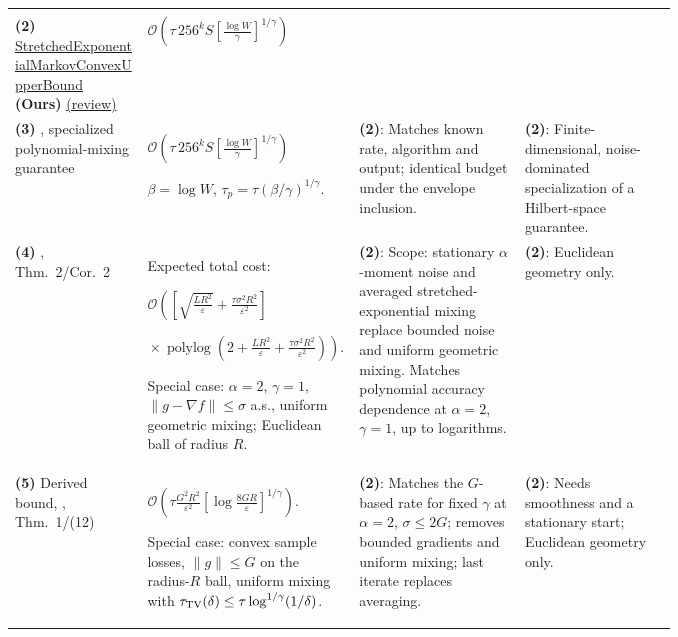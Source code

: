 \begin{table}[tp]
\begin{threeparttable}
\begin{tabularx}{\linewidth}{@{}>{\raggedright\arraybackslash}p{0.20\linewidth}>{\raggedright\arraybackslash}p{0.32\linewidth}>{\raggedright\arraybackslash}p{0.25\linewidth}>{\raggedright\arraybackslash}X@{}}
\midrule
\multicolumn{4}{@{}l}{\textbf{Upper bounds: sufficient budgets}} \\
\textbf{(2)} \href{https://github.com/k3nfalt/longtails/blob/main/LongTails/Theorems/StretchedExponentialMarkovConvexUpperBound.lean}{Stretched\allowbreak Exponential\allowbreak Markov\allowbreak Convex\allowbreak Upper\allowbreak Bound} \textbf{(Ours)} \href{https://github.com/k3nfalt/longtails/blob/main/scripts/reviews/StretchedExponentialMarkovConvexUpperBound.md}{(review)} & $\displaystyle\mathcal{O}\!\left(\tau\,256^k S\left[\frac{\log W}{\gamma}\right]^{1/\gamma}\right)$ & & \\
\midrule[1.2pt]
\textbf{(3)} \citep{semcPolynomialRepository}, specialized polynomial-mixing guarantee & $\displaystyle\mathcal{O}\!\left(\tau\,256^k S\left[\frac{\log W}{\gamma}\right]^{1/\gamma}\right)$\par $\beta=\log W$, $\tau_p=\tau(\beta/\gamma)^{1/\gamma}$. & \textbf{(2)}: Matches known rate, algorithm and output; identical budget under the envelope inclusion. & \textbf{(2)}: Finite-dimensional, noise-dominated specialization of a Hilbert-space guarantee. \\
\midrule
\textbf{(4)} \citep{htmSolodkin2025v2}, Thm.~2/Cor.~2 & Expected total cost:\par $\displaystyle\mathcal{O}\!\left(\left[\sqrt{\frac{LR^2}{\varepsilon}}+\frac{\tau\sigma^2R^2}{\varepsilon^2}\right]\right.$\par $\displaystyle\left.{}\times\operatorname{polylog}\!\left(2+\frac{LR^2}{\varepsilon}+\frac{\tau\sigma^2R^2}{\varepsilon^2}\right)\right)$.\par Special case: $\alpha=2$, $\gamma=1$, $\|g-\nabla f\|\le\sigma$ a.s., uniform geometric mixing; Euclidean ball of radius $R$. & \textbf{(2)}: Scope: stationary $\alpha$-moment noise and averaged stretched-exponential mixing replace bounded noise and uniform geometric mixing. Matches polynomial accuracy dependence at $\alpha=2$, $\gamma=1$, up to logarithms. & \textbf{(2)}: Euclidean geometry only. \\
\midrule
\textbf{(5)} Derived bound, \citep{htmDuchi2012v3}, Thm.~1/(12) & $\displaystyle\mathcal{O}\!\left(\tau\frac{G^2R^2}{\varepsilon^2}\left[\log\frac{8GR}{\varepsilon}\right]^{1/\gamma}\right)$.\par Special case: convex sample losses, $\|g\|\le G$ on the radius-$R$ ball, uniform mixing with $\tau_{\rm TV}(\delta)\le\tau\log^{1/\gamma}(1/\delta)$. & \textbf{(2)}: Matches the $G$-based rate for fixed $\gamma$ at $\alpha=2$, $\sigma\le2G$; removes bounded gradients and uniform mixing; last iterate replaces averaging. & \textbf{(2)}: Needs smoothness and a stationary start; Euclidean geometry only. \\

\end{tabularx}
\end{threeparttable}
\end{table}
